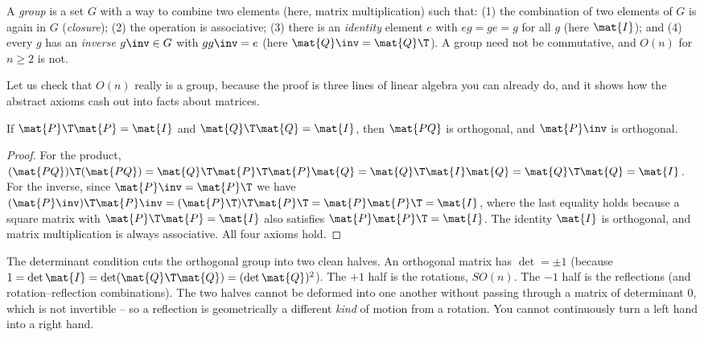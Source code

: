 \begin{formalbox}
A \emph{group} is a set $G$ with a way to combine two elements (here, matrix
multiplication) such that: (1) the combination of two elements of $G$ is again in
$G$ (\emph{closure}); (2) the operation is associative; (3) there is an
\emph{identity} element $e$ with $e g = g e = g$ for all $g$ (here $\mat{I}$); and
(4) every $g$ has an \emph{inverse} $g\inv \in G$ with $g g\inv = e$ (here
$\mat{Q}\inv = \mat{Q}\T$). A group need not be commutative, and $O(n)$ for
$n\ge 2$ is not.
\end{formalbox}

Let us check that $O(n)$ really is a group, because the proof is three lines of
linear algebra you can already do, and it shows how the abstract axioms cash out
into facts about matrices.

\begin{proposition}[$O(n)$ is a group]
\label{ch37:prop-ongroup}
If $\mat{P}\T\mat{P}=\mat{I}$ and $\mat{Q}\T\mat{Q}=\mat{I}$, then $\mat{PQ}$ is
orthogonal, and $\mat{P}\inv$ is orthogonal.
\end{proposition}

\begin{proof}
For the product, $(\mat{PQ})\T(\mat{PQ}) = \mat{Q}\T\mat{P}\T\mat{P}\mat{Q}
= \mat{Q}\T\mat{I}\mat{Q} = \mat{Q}\T\mat{Q} = \mat{I}$. For the inverse, since
$\mat{P}\inv = \mat{P}\T$ we have $(\mat{P}\inv)\T \mat{P}\inv
= (\mat{P}\T)\T\mat{P}\T = \mat{P}\mat{P}\T = \mat{I}$, where the last equality
holds because a square matrix with $\mat{P}\T\mat{P}=\mat{I}$ also satisfies
$\mat{P}\mat{P}\T=\mat{I}$. The identity $\mat{I}$ is orthogonal, and matrix
multiplication is always associative. All four axioms hold.
\end{proof}

The determinant condition cuts the orthogonal group into two clean halves. An
orthogonal matrix has $\det = \pm 1$ (because $1 = \det\mat{I} = \det(\mat{Q}\T\mat{Q})
= (\det\mat{Q})^2$). The $+1$ half is the rotations, $SO(n)$. The $-1$ half is the
reflections (and rotation--reflection combinations). The two halves cannot be
deformed into one another without passing through a matrix of determinant $0$,
which is not invertible -- so a reflection is geometrically a different \emph{kind}
of motion from a rotation. You cannot continuously turn a left hand into a right
hand.

